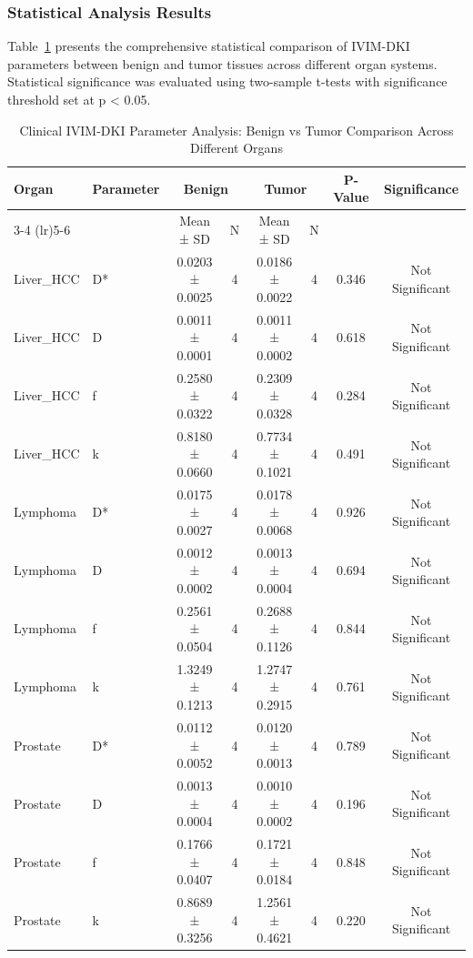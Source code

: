 \documentclass[a4paper,12pt]{article}
\begin{document}
\subsubsection{Statistical Analysis Results}

Table~\ref{tab:clinical_ivim_analysis} presents the comprehensive statistical comparison of IVIM-DKI parameters between benign and tumor tissues across different organ systems. Statistical significance was evaluated using two-sample t-tests with significance threshold set at p < 0.05.

\begin{table}[H]
\centering
\caption{Clinical IVIM-DKI Parameter Analysis: Benign vs Tumor Comparison Across Different Organs}
\begin{tabular}{@{}llcccccc@{}}
\toprule
Organ & Parameter & \multicolumn{2}{c}{Benign} & \multicolumn{2}{c}{Tumor} & P-Value & Significance \\
\cmidrule(lr){3-4} \cmidrule(lr){5-6}
& & Mean ± SD & N & Mean ± SD & N & & \\
\midrule
Liver\_HCC & D* & 0.0203 ± 0.0025 & 4 & 0.0186 ± 0.0022 & 4 & 0.346 & Not Significant \\
Liver\_HCC & D & 0.0011 ± 0.0001 & 4 & 0.0011 ± 0.0002 & 4 & 0.618 & Not Significant \\
Liver\_HCC & f & 0.2580 ± 0.0322 & 4 & 0.2309 ± 0.0328 & 4 & 0.284 & Not Significant \\
Liver\_HCC & k & 0.8180 ± 0.0660 & 4 & 0.7734 ± 0.1021 & 4 & 0.491 & Not Significant \\
\midrule
Lymphoma & D* & 0.0175 ± 0.0027 & 4 & 0.0178 ± 0.0068 & 4 & 0.926 & Not Significant \\
Lymphoma & D & 0.0012 ± 0.0002 & 4 & 0.0013 ± 0.0004 & 4 & 0.694 & Not Significant \\
Lymphoma & f & 0.2561 ± 0.0504 & 4 & 0.2688 ± 0.1126 & 4 & 0.844 & Not Significant \\
Lymphoma & k & 1.3249 ± 0.1213 & 4 & 1.2747 ± 0.2915 & 4 & 0.761 & Not Significant \\
\midrule
Prostate & D* & 0.0112 ± 0.0052 & 4 & 0.0120 ± 0.0013 & 4 & 0.789 & Not Significant \\
Prostate & D & 0.0013 ± 0.0004 & 4 & 0.0010 ± 0.0002 & 4 & 0.196 & Not Significant \\
Prostate & f & 0.1766 ± 0.0407 & 4 & 0.1721 ± 0.0184 & 4 & 0.848 & Not Significant \\
Prostate & k & 0.8689 ± 0.3256 & 4 & 1.2561 ± 0.4621 & 4 & 0.220 & Not Significant \\
\bottomrule
\end{tabular}
\label{tab:clinical_ivim_analysis}
\end{table}
\end{document}
